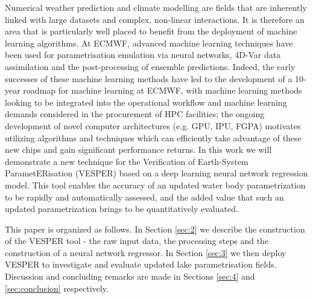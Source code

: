 \documentclass[twocolumn]{article}
\begin{document}
\noindent Numerical weather prediction and climate modelling are fields that are inherently linked with large datasets and complex, non-linear interactions. It is therefore an area that is particularly well placed to benefit from the deployment of machine learning algorithms. At ECMWF, advanced machine learning techniques have been used for parametrisation emulation via neural networks\cite{Chantry2021}, 4D-Var data assimilation\cite{Hatfield2021} and the post-processing of ensemble predictions\cite{Hewson2021}. Indeed, the early successes of these machine learning methods have led to the development of a 10-year roadmap for machine learning at ECMWF\cite{p19877}, with machine learning methods looking to be integrated into the operational workflow and machine learning demands considered in the procurement of HPC facilities; the ongoing development of novel computer architectures (e.g. GPU, IPU, FGPA) motivates utilizing algorithms and techniques which can efficiently take advantage of these new chips and gain significant performance returns. In this work we will demonstrate a new technique for the Verification of Earth-System ParametERisation (VESPER) based on a deep learning neural network regression model. This tool enables the accuracy of an updated water body parametrization to be rapidly and automatically assessed, and the added value that such an updated parametrization brings to be quantitatively evaluated. \newline 


\noindent This paper is organized as follows. In Section \ref{sec:2} we describe the construction of the VESPER tool - the raw input data, the processing steps and the construction of a neural network regressor. In Section \ref{sec:3} we then deploy VESPER to investigate and evaluate updated lake parametrisation fields. Discussion and concluding remarks are made in Sections \ref{sec:4} and \ref{sec:conclusion} respectively. 
\end{document}

